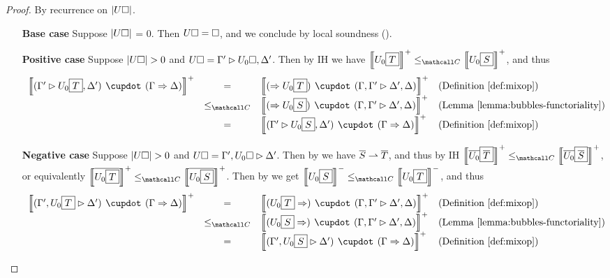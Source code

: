 \begin{proof}
  By recurrence on $\left|U\square\right|$.
  \begin{itemize}
    \item[\textbf{Base case}] Suppose $\left|U\square\right|$ = 0. Then $U\square =
    \square$, and we conclude by local soundness
    ().
    \item[\textbf{Positive case}] Suppose $\left|U\square\right| > 0$ and $U\square =
    \Gamma' \mathbin{\rhd} U_0\square, \Delta'$. Then by IH we have $\psint{U_0\select{T}}
    \sementC \psint{U_0\select{S}}$, and thus
    $$
    \begin{array}{rcll}
      \psint{(\Gamma' \J U_0\select{T}, \Delta') \mix (\Gamma \seq \Delta)}
      &=& \psint{(\seq U_0\select{T}) \mix (\Gamma, \Gamma' \J \Delta', \Delta)} &\text{(\refdef{mixop})}\\
      &\sementC& \psint{(\seq U_0\select{S}) \mix (\Gamma, \Gamma' \J \Delta', \Delta)} &\text{(\reflemma{bubbles-functoriality})}\\
      &=& \psint{(\Gamma' \J U_0\select{S}, \Delta') \mix (\Gamma \seq \Delta)} &\text{(\refdef{mixop})}
    \end{array}
    $$

    \item[\textbf{Negative case}] Suppose $\left|U\square\right| > 0$ and $U\square =
    \Gamma', U_0\square \mathbin{\rhd} \Delta'$. Then by  we have
    $\overline{S} \rightharpoonup \overline{T}$, and thus by IH
    $\psint{\soldual{U_0}\select{\soldual{T}}} \sementC
    \psint{\soldual{U_0}\select{\soldual{S}}}$, or equivalently
    $\psint{\soldual{U_0\select{T}}} \sementC \psint{\soldual{U_0\select{S}}}$.
    Then by  we get $\nsint{U_0\select{S}} \sementC
    \nsint{U_0\select{T}}$, and thus
    $$
    \begin{array}{rcll}
      \psint{(\Gamma', U_0\select{T} \J \Delta') \mix (\Gamma \seq \Delta)}
      &=& \psint{(U_0\select{T} \seq) \mix (\Gamma, \Gamma' \J \Delta', \Delta)} &\text{(\refdef{mixop})}\\
      &\sementC& \psint{(U_0\select{S} \seq) \mix (\Gamma, \Gamma' \J \Delta', \Delta)} &\text{(\reflemma{bubbles-functoriality})}\\
      &=& \psint{(\Gamma', U_0\select{S} \J \Delta') \mix (\Gamma \seq \Delta)} &\text{(\refdef{mixop})}
    \end{array}
    $$


\end{itemize}
\end{proof}

